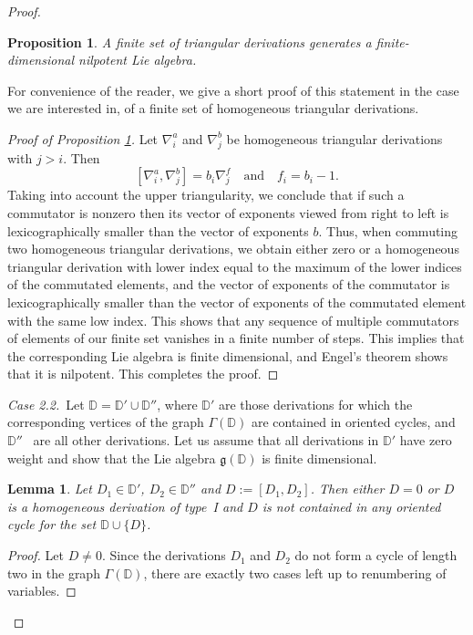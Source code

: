 \documentclass[a4paper, 12pt,oneside,reqno]{amsart}
\numberwithin{equation}{section}
\newtheorem{lemma}[theorem]{Lemma}
\newtheorem{proposition}[theorem]{Proposition}
\theoremstyle{definition}
\begin{document}
\begin{proof}
\begin{proposition}\label{inner_prop}
A finite set of triangular derivations generates a finite-dimensional nilpotent Lie algebra.
\end{proposition}

For convenience of the reader, we give a short proof of this statement in the case we are interested in, of a finite set of homogeneous triangular derivations.

\begin{proof}[Proof of Proposition \ref{inner_prop}]
Let $\nabla^a_i$ and $\nabla^b_j$ be homogeneous triangular derivations with $j>i$. Then
$$
[\nabla^a_i, \nabla^b_j]=b_i\nabla^f_j \quad \text{and} \quad f_i=b_i-1.
$$
Taking into account the upper triangularity, we conclude that if such a commutator is nonzero then its vector of exponents viewed from right to left is lexicographically smaller than the vector of exponents $b$. Thus, when commuting two homogeneous triangular derivations, we obtain either zero or a homogeneous triangular derivation with lower index equal to the maximum of the lower indices of the commutated elements, and the vector of exponents of the commutator is lexicographically smaller than the vector of exponents of the commutated element with the same low index. This shows that any sequence of multiple commutators of elements of our finite set vanishes in a finite number of steps. This implies that the corresponding Lie algebra is finite dimensional, and Engel's theorem shows that it is nilpotent. This completes the proof.
\end{proof}

{\it Case 2.2.}\ Let $\mathbb{D}=\mathbb{D}'\cup\mathbb{D}''$, where $\mathbb{D}'$ are those derivations for which the corresponding vertices of the graph $\Gamma(\mathbb{D})$ are contained in oriented cycles, and $\mathbb{D}''$~ are all other derivations. Let us assume that all derivations in $\mathbb{D}'$ have zero weight and show that the Lie algebra $\mathfrak{g}(\mathbb{D})$ is finite dimensional.


\begin{lemma} \label{ld}
Let $D_1\in\mathbb{D}'$, $D_2\in\mathbb{D}''$ and $D:=[D_1,D_2]$. Then either $D=0$ or $D$ is a homogeneous derivation of type~I and $D$ is not contained in any oriented cycle for the set $\mathbb{D}\cup\{ D\}$.
\end{lemma}

\begin{proof}
Let $D\ne 0$. Since the derivations $D_1$ and $D_2$ do not form a cycle of length two in the graph $\Gamma(\mathbb{D})$, there are exactly two cases left up to renumbering of variables.


\end{proof}
\end{proof}
\end{document}
